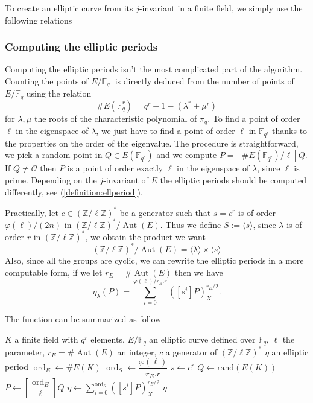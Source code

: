 \documentclass[12pt]{article}
\theoremstyle{plain}
\theoremstyle{definition}
\DeclareMathOperator{\order}{ord} %
\DeclareMathOperator{\Aut}{Aut}
\def\Z{\ensuremath{\mathbb{Z}}}
\def\F{\ensuremath{\mathbb{F}}}
\newcounter{algorithm}
\begin{document}
To create an elliptic curve from its $j$-invariant in a finite field, we simply
use the following relations

\subsubsection{Computing the elliptic periods}

Computing the elliptic periods isn't the most complicated part of the algorithm.
Counting the points of $E/\F_{q^r}$ is directly deduced from the number of
points of $E/\F_q$ using the relation
\begin{equation}
\#E(\F_q^r)=q^r+1-(\lambda^r+\mu^r)
\end{equation}
for $\lambda, \mu$ the roots of the characteristic polynomial of $\pi_q$. To find a
point of order $\ell$ in the eigenspace of $\lambda$, we just have to find a point of
order $\ell$ in $\F_{q^r}$ thanks to the properties on the order of the eigenvalue.
The procedure is straightforward, we pick a random point in $Q\in E(\F_{q^r})$
and we compute $P = [\#E(\F_{q^r})/\ell]Q$. If $Q\neq\mathcal{O}$ then $P$ is a
point of order exactly $\ell$ in the eigenspace of $\lambda$, since $\ell$ is prime.
Depending on the $j$-invariant of $E$ the elliptic periods should be computed 
differently, see (\ref{definition:ellperiod}).
 
Practically, let $c\in(\Z/\ell\Z)^{\ast}$ be a generator such that $s = c^r$ is 
of order $\varphi(\ell)/(2n)$ in $(\Z/\ell\Z)^{\ast}/\Aut(E)$. Thus we define $S 
:= \langle{s}\rangle$, since $\lambda$ is of order $r$ in $(\Z/\ell\Z)^{\ast}$, we 
obtain the product we want
\[
(\Z/\ell\Z)^{\ast}/\Aut(E) = \langle{\lambda}\rangle\times\langle{s}\rangle
\]
Also, since all the groups are cyclic, we can rewrite the elliptic periods in a
more computable form, if we let $r_E = \#\Aut(E)$ then we have
\begin{equation}
\eta_\lambda(P) = \sum_{i = 0}^{\varphi(\ell)/r_E.r}{\left([s^i]P\right)_X^{r_E/2}}.
\end{equation}

The function can be summarized as follow

\begin{algorithm}
\label{algorithm:compell}
    \begin{algorithmic}[1]
    \REQUIRE $K$ a finite field with $q^r$ elements, $E/\F_q$ an elliptic curve
defined over $\F_q$, $\ell$ the parameter, $r_E = \#\Aut(E)$ an integer, $c$ a 
generator of $(\Z/\ell\Z)^{\ast}$
    \ENSURE $\eta$ an elliptic period
    \STATE $\order_E\leftarrow\#E(K)$
    \STATE $\order_S \leftarrow \dfrac{\varphi(\ell)}{r_E.r}$
    \STATE $s \leftarrow c^r$
    \REPEAT
        \STATE $Q\leftarrow\text{rand}(E(K))$
        \STATE $P\leftarrow[\dfrac{\order_E}{\ell}]Q$
    \STATE $\eta\leftarrow\sum_{i=0}^{\order_S}{\left([s^i]P\right)_X^{r_E/2}}$
    \RETURN $\eta$
    \end{algorithmic}
\end{algorithm}
\end{document}
